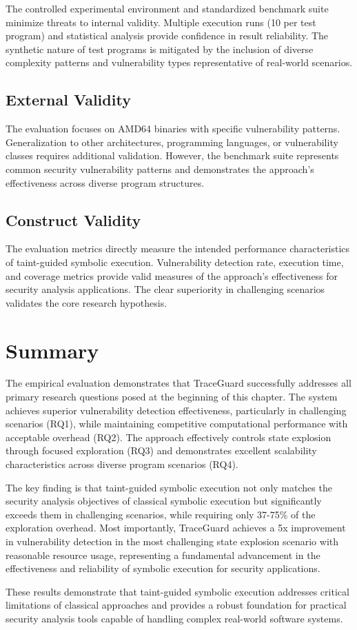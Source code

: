 The controlled experimental environment and standardized benchmark suite minimize threats to internal validity. Multiple execution runs (10 per test program) and statistical analysis provide confidence in result reliability. The synthetic nature of test programs is mitigated by the inclusion of diverse complexity patterns and vulnerability types representative of real-world scenarios.

\subsection{External Validity}

The evaluation focuses on AMD64 binaries with specific vulnerability patterns. Generalization to other architectures, programming languages, or vulnerability classes requires additional validation. However, the benchmark suite represents common security vulnerability patterns and demonstrates the approach's effectiveness across diverse program structures.

\subsection{Construct Validity}

The evaluation metrics directly measure the intended performance characteristics of taint-guided symbolic execution. Vulnerability detection rate, execution time, and coverage metrics provide valid measures of the approach's effectiveness for security analysis applications. The clear superiority in challenging scenarios validates the core research hypothesis.

\section{Summary}

The empirical evaluation demonstrates that TraceGuard successfully addresses all primary research questions posed at the beginning of this chapter. The system achieves superior vulnerability detection effectiveness, particularly in challenging scenarios (RQ1), while maintaining competitive computational performance with acceptable overhead (RQ2). The approach effectively controls state explosion through focused exploration (RQ3) and demonstrates excellent scalability characteristics across diverse program scenarios (RQ4).

The key finding is that taint-guided symbolic execution not only matches the security analysis objectives of classical symbolic execution but significantly exceeds them in challenging scenarios, while requiring only 37-75\% of the exploration overhead. Most importantly, TraceGuard achieves a 5x improvement in vulnerability detection in the most challenging state explosion scenario with reasonable resource usage, representing a fundamental advancement in the effectiveness and reliability of symbolic execution for security applications.

These results demonstrate that taint-guided symbolic execution addresses critical limitations of classical approaches and provides a robust foundation for practical security analysis tools capable of handling complex real-world software systems.
